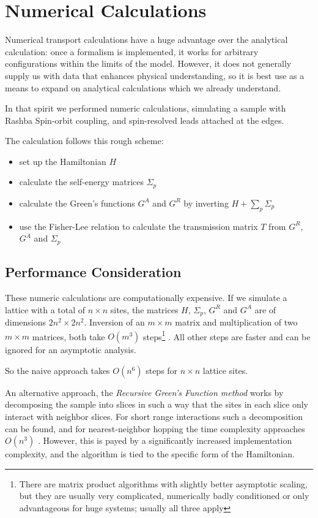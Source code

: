 \chapter{Numerical Calculations}

Numerical transport calculations have a huge advantage over the analytical
calculation: once a formalism is implemented, it works for arbitrary
configurations within the limits of the model. However, it does not generally
supply us with data that enhances physical understanding, so it is best use as a
means to expand on analytical calculations which we already understand.

In that spirit we performed numeric calculations, simulating a sample with
Rashba Spin-orbit coupling, and spin-resolved leads attached at the edges.

The calculation follows this rough scheme:

\begin{itemize}
    \item set up the Hamiltonian $H$
    \item calculate the self-energy matrices $\Sigma_p$
    \item calculate the Green's functions $G^A$ and $G^R$ by inverting
          $H + \sum_p \Sigma_p$
    \item use the Fisher-Lee relation to calculate the transmission matrix $T$
            from $G^R$, $G^A$ and $\Sigma_p$
\end{itemize}

\section{Performance Consideration}

These numeric calculations are computationally expensive. If we simulate a
lattice with a total of $n \times n$ sites, the matrices $H$, $\Sigma_p$, $G^R$ and
$G^A$ are of dimensions $2n^2 \times 2n^2$. Inversion of an $m \times m $
matrix and multiplication of two $ m \times m $ matrices, both take $O(m^3)$
steps\footnote{There are matrix product algorithms with slightly better
asymptotic scaling, but they are usually very complicated, numerically badly
conditioned or only advantageous for huge systems; usually all three apply}
\cite{matrixperformance}. All other steps are faster and can be ignored for
an asymptotic analysis.

So the naive approach takes $O(n^6)$ steps for $n \times n$ lattice sites.

An alternative approach, the \emph{Recursive Green's Function method} works by
decomposing the sample into slices in such a way that the sites in each slice
only interact with neighbor slices. For short range interactions such a
decomposition can be found, and for nearest-neighbor hopping the time
complexity approaches $O(n^3)$ \cite{rgfschmelcher}. However, this is payed by
a significantly increased implementation complexity, and the algorithm is tied
to the specific form of the Hamiltonian.

